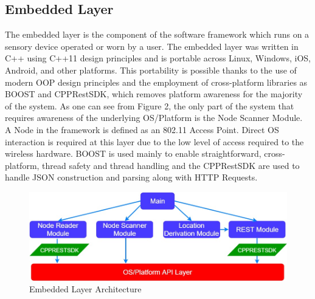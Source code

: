 \documentclass[conference]{IEEEtran}
\begin{document}
\subsection{Embedded Layer}
The embedded layer is the component of the software framework which runs on a sensory device operated or worn by a user. The embedded layer was written in C++ using C++11 design principles and is portable across Linux, Windows, iOS, Android, and other platforms. This portability is possible thanks to the use of modern OOP design principles and the employment of cross-platform libraries as BOOST and CPPRestSDK, which removes platform awareness for the majority of the system. As one can see from Figure 2, the only part of the system that requires awareness of the underlying OS/Platform is the Node Scanner Module. A Node in the framework is defined as an 802.11 Access Point. Direct OS interaction is required at this layer due to the low level of access required to the wireless hardware.
BOOST is used mainly to enable straightforward, cross-platform, thread safety and thread handling and the CPPRestSDK are used to handle JSON construction and parsing along with HTTP Requests.
\begin{figure}[H]
    \includegraphics[width=9 cm,height=3.5 cm]{Pink_Panther_Architecture.jpg}
    \caption{Embedded Layer Architecture}
    \end{figure}
\end{document}
